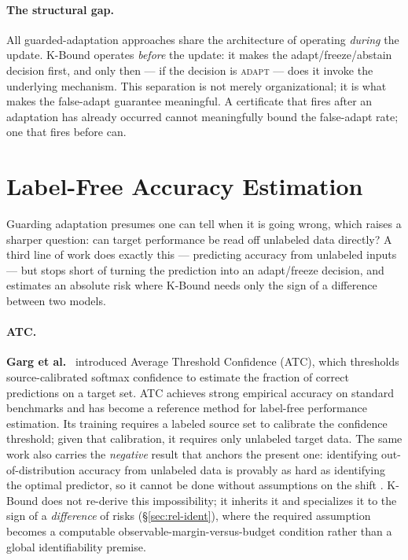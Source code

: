 \paragraph{The structural gap.}
All guarded-adaptation approaches share the architecture of operating
\emph{during} the update.
K-Bound operates \emph{before} the update: it makes the adapt/freeze/abstain
decision first, and only then --- if the decision is \textsc{adapt} ---
does it invoke the underlying mechanism.
This separation is not merely organizational; it is what makes the
false-adapt guarantee meaningful.
A certificate that fires after an adaptation has already occurred cannot
meaningfully bound the false-adapt rate; one that fires before can.

\section{Label-Free Accuracy Estimation}\label{sec:rel-estimation}

Guarding adaptation presumes one can tell when it is going wrong, which raises a
sharper question: can target performance be read off unlabeled data directly? A
third line of work does exactly this --- predicting accuracy from unlabeled
inputs --- but stops short of turning the prediction into an adapt/freeze
decision, and estimates an absolute risk where K-Bound needs only the sign of a
difference between two models.

\paragraph{ATC.}
\textbf{Garg et al.}~\cite{garg2022atc} introduced Average Threshold
Confidence (ATC), which thresholds source-calibrated softmax confidence to
estimate the fraction of correct predictions on a target set.
ATC achieves strong empirical accuracy on standard benchmarks and has become
a reference method for label-free performance estimation.
Its training requires a labeled source set to calibrate the confidence
threshold; given that calibration, it requires only unlabeled target data.
The same work also carries the \emph{negative} result that anchors the present
one: identifying out-of-distribution accuracy from unlabeled data is provably as
hard as identifying the optimal predictor, so it cannot be done without
assumptions on the shift \cite{garg2022atc}. K-Bound does not re-derive this
impossibility; it inherits it and specializes it to the sign of a
\emph{difference} of risks (\S\ref{sec:rel-ident}), where the required
assumption becomes a computable observable-margin-versus-budget condition rather
than a global identifiability premise.

